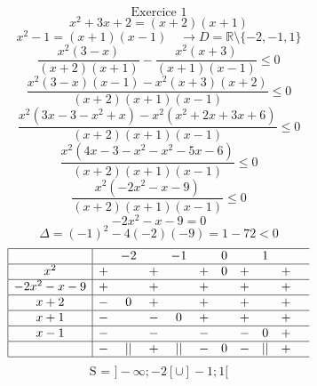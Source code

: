 \documentclass{article}
\begin{document}
\[ \text{Exercice 1} \]
\[ x^2+3x+2 = (x+2)(x+1) \]
\[ x^2 - 1 = (x+1)(x-1) \quad \to D = \mathbb{R} \setminus \{-2, -1, 1\} \]
\[ \frac{x^2(3-x)}{(x+2)(x+1)} - \frac{x^2(x+3)}{(x+1)(x-1)} \le 0 \]
\[ \frac{x^2(3-x)(x-1) - x^2(x+3)(x+2)}{(x+2)(x+1)(x-1)} \le 0 \]
\[ \frac{x^2(3x-3-x^2+x) - x^2(x^2+2x+3x+6)}{(x+2)(x+1)(x-1)} \le 0 \]
\[ \frac{x^2(4x - 3 - x^2 - x^2 - 5x - 6)}{(x+2)(x+1)(x-1)} \le 0 \]
\[ \frac{x^2(-2x^2 - x - 9)}{(x+2)(x+1)(x-1)} \le 0 \]
\[ -2x^2-x-9 = 0 \]
\[ \Delta = (-1)^2 - 4(-2)(-9) = 1 - 72 < 0 \]
\[
\begin{array}{|c|ccccccccccccc|}
\hline
 & & -2 & & -1 & & 0 & & 1 & & \\
\hline
x^2 & + & & + & & + & 0 & + & & + \\
\hline
-2x^2-x-9 & + & & + & & + & & + & & + \\
\hline
x+2 & - & 0 & + & & + & & + & & + \\
\hline
x+1 & - & & - & 0 & + & & + & & + \\
\hline
x-1 & - & & - & & - & & - & 0 & + \\
\hline
 & - & \text{||} & + & \text{||} & - & 0 & - & \text{||} & + \\
\hline
\end{array}
\]
\[ \text{S = } ]-\infty; -2[ \cup ]-1; 1[ \]
\end{document}
